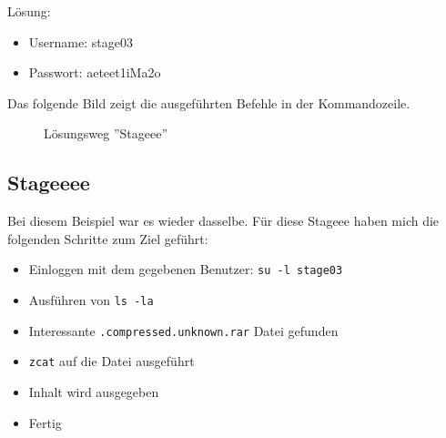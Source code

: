 \documentclass[12pt, a4paper, titlepage, oneside]{scrartcl}
\begin{document}
	Lösung:
	\begin{itemize}
		\item Username: stage03

		\item Passwort: aeteet1iMa2o
	\end{itemize}

	Das folgende Bild zeigt die ausgeführten Befehle in der Kommandozeile.
	\begin{figure}[h!]
		\centering
		\caption{Lösungsweg ''Stageee''}
		\label{fig:stageee_solution}
	\end{figure}

	\subsection{Stageeee}
	Bei diesem Beispiel war es wieder dasselbe. Für diese Stageee haben mich die
	folgenden Schritte zum Ziel geführt:

	\begin{itemize}
		\item Einloggen mit dem gegebenen Benutzer: \lstinline{su -l stage03}

		\item Ausführen von \lstinline{ls -la}

		\item Interessante \lstinline{.compressed.unknown.rar} Datei gefunden

		\item \lstinline{zcat} auf die Datei ausgeführt

		\item Inhalt wird ausgegeben

		\item Fertig
	\end{itemize}
\end{document}
